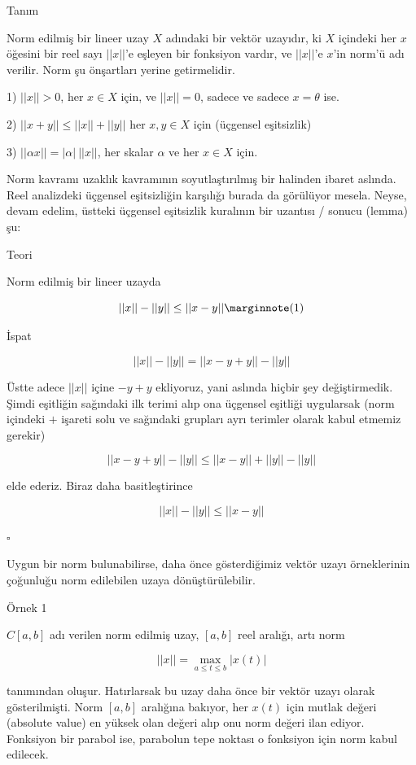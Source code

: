 \documentclass[12pt,fleqn]{article}\usepackage{../../common}
\begin{document}
Tanım

Norm edilmiş bir lineer uzay $X$ adındaki bir vektör uzayıdır, ki $X$
içindeki her $x$ öğesini bir reel sayı $||x||$'e eşleyen bir fonksiyon
vardır, ve $||x||$'e $x$'in norm'ü adı verilir. Norm şu önşartları yerine
getirmelidir. 

1) $||x|| > 0$, her $x \in X$ için, ve $||x|| = 0$, sadece ve sadece $x =
\theta$ ise. 

2) $||x+y|| \le ||x|| + ||y||$ her $x,y \in X$ için (üçgensel eşitsizlik) 

3) $||\alpha x|| = |\alpha| \ ||x||$, her skalar $\alpha$ ve her $x \in X$ için. 

Norm kavramı uzaklık kavramının soyutlaştırılmış bir halinden ibaret
aslında. Reel analizdeki üçgensel eşitsizliğin karşılığı burada da
görülüyor mesela. Neyse, devam edelim, üstteki üçgensel eşitsizlik
kuralının bir uzantısı / sonucu (lemma) şu:

Teori 

Norm edilmiş bir lineer uzayda 

$$ ||x|| - ||y|| \le ||x-y|| 
\mlabel{1}
$$

İspat

$$ ||x|| - ||y|| = ||x - y + y|| - ||y||$$

Üstte adece $||x||$ içine $-y+y$ ekliyoruz, yani aslında hiçbir şey
değiştirmedik. Şimdi eşitliğin sağındaki ilk terimi alıp ona üçgensel
eşitliği uygularsak (norm içindeki $+$ işareti solu ve sağındaki grupları
ayrı terimler olarak kabul etmemiz gerekir)

$$ ||x - y + y|| - ||y|| \le
||x - y || + ||y|| - ||y|| 
$$

elde ederiz. Biraz daha basitleştirince

$$ ||x|| - ||y||  \le ||x - y ||  $$

$\square$

Uygun bir norm bulunabilirse, daha önce gösterdiğimiz vektör uzayı
örneklerinin çoğunluğu norm edilebilen uzaya dönüştürülebilir.

Örnek 1

$C[a,b]$ adı verilen norm edilmiş uzay, $[a,b]$ reel aralığı, artı norm

$$ ||x|| = \max_{a \le t \le b} |x(t)| $$

tanımından oluşur. Hatırlarsak bu uzay daha önce bir vektör uzayı olarak
gösterilmişti. Norm $[a,b]$ aralığına bakıyor, her $x(t)$ için mutlak değeri
(absolute value) en yüksek olan değeri alıp onu norm değeri ilan
ediyor. Fonksiyon bir parabol ise, parabolun tepe noktası o fonksiyon için
norm kabul edilecek. 
\end{document}
